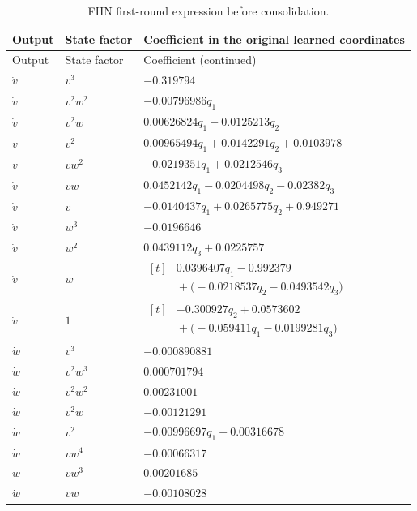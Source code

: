 \begingroup\small
\setlength{\tabcolsep}{5pt}
\begin{longtable}{@{}p{1.2cm}p{2cm}p{11.5cm}@{}}
\caption{FHN first-round expression before consolidation.}\label{tab:raw_fhn}\\
\toprule Output & State factor & Coefficient in the original learned coordinates\\\midrule\endfirsthead
\toprule Output & State factor & Coefficient (continued)\\\midrule\endhead
\bottomrule\endfoot
$\dot v$ & $v^{3}$ & $-0.319794$\\
$\dot v$ & $v^{2} w^{2}$ & $- 0.00796986 q_{1}$\\
$\dot v$ & $v^{2} w$ & $0.00626824 q_{1} - 0.0125213 q_{2}$\\
$\dot v$ & $v^{2}$ & $0.00965494 q_{1} + 0.0142291 q_{2} + 0.0103978$\\
$\dot v$ & $v w^{2}$ & $- 0.0219351 q_{1} + 0.0212546 q_{3}$\\
$\dot v$ & $v w$ & $0.0452142 q_{1} - 0.0204498 q_{2} - 0.02382 q_{3}$\\
$\dot v$ & $v$ & $- 0.0140437 q_{1} + 0.0265775 q_{2} + 0.949271$\\
$\dot v$ & $w^{3}$ & $-0.0196646$\\
$\dot v$ & $w^{2}$ & $0.0439112 q_{3} + 0.0225757$\\
$\dot v$ & $w$ & $\begin{aligned}[t]&0.0396407 q_{1} - 0.992379\\&{}+\bigl(- 0.0218537 q_{2} - 0.0493542 q_{3}\bigr)\end{aligned}$\\
$\dot v$ & $1$ & $\begin{aligned}[t]&- 0.300927 q_{2} + 0.0573602\\&{}+\bigl(- 0.059411 q_{1} - 0.0199281 q_{3}\bigr)\end{aligned}$\\
\addlinespace
$\dot w$ & $v^{3}$ & $-0.000890881$\\
$\dot w$ & $v^{2} w^{3}$ & $0.000701794$\\
$\dot w$ & $v^{2} w^{2}$ & $0.00231001$\\
$\dot w$ & $v^{2} w$ & $-0.00121291$\\
$\dot w$ & $v^{2}$ & $- 0.00996697 q_{1} - 0.00316678$\\
$\dot w$ & $v w^{4}$ & $-0.00066317$\\
$\dot w$ & $v w^{3}$ & $0.00201685$\\
$\dot w$ & $v w$ & $-0.00108028$\\

\end{longtable}
